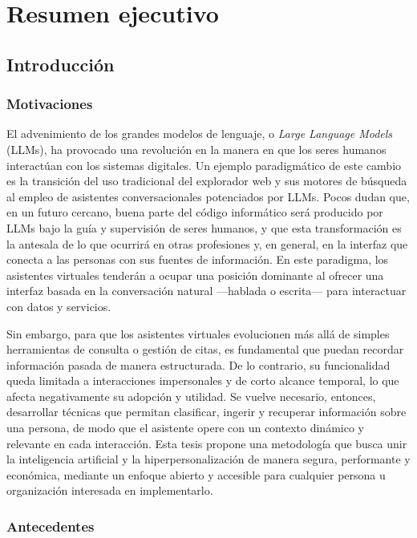 \section{Resumen ejecutivo}

\subsection{Introducción}

\subsubsection{Motivaciones}

El advenimiento de los grandes modelos de lenguaje, o \textit{Large Language Models} (LLMs), ha provocado una revolución en la manera en que los seres humanos interactúan con los sistemas digitales. Un ejemplo paradigmático de este cambio es la transición del uso tradicional del explorador web y sus motores de búsqueda al empleo de asistentes conversacionales potenciados por LLMs. Pocos dudan que, en un futuro cercano, buena parte del código informático será producido por LLMs bajo la guía y supervisión de seres humanos, y que esta transformación es la antesala de lo que ocurrirá en otras profesiones y, en general, en la interfaz que conecta a las personas con sus fuentes de información. En este paradigma, los asistentes virtuales tenderán a ocupar una posición dominante al ofrecer una interfaz basada en la conversación natural —hablada o escrita— para interactuar con datos y servicios.

Sin embargo, para que los asistentes virtuales evolucionen más allá de simples herramientas de consulta o gestión de citas, es fundamental que puedan recordar información pasada de manera estructurada. De lo contrario, su funcionalidad queda limitada a interacciones impersonales y de corto alcance temporal, lo que afecta negativamente su adopción y utilidad. Se vuelve necesario, entonces, desarrollar técnicas que permitan clasificar, ingerir y recuperar información sobre una persona, de modo que el asistente opere con un contexto dinámico y relevante en cada interacción. Esta tesis propone una metodología que busca unir la inteligencia artificial y la hiperpersonalización de manera segura, performante y económica, mediante un enfoque abierto y accesible para cualquier persona u organización interesada en implementarlo.

\subsubsection{Antecedentes}

